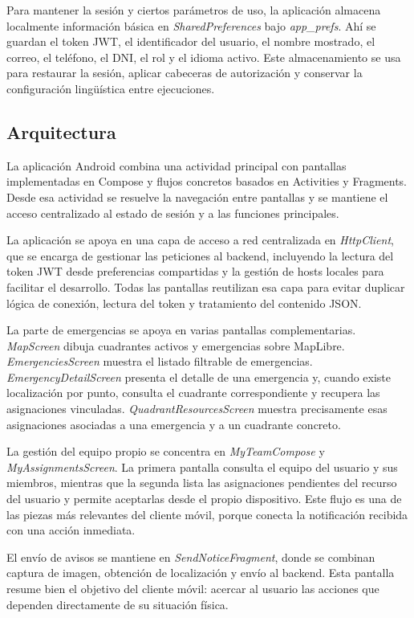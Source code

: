 Para mantener la sesión y ciertos parámetros de uso, la aplicación almacena localmente información básica en \textit{SharedPreferences} bajo \textit{app\_prefs}. Ahí se guardan el token JWT, el identificador del usuario, el nombre mostrado, el correo, el teléfono, el DNI, el rol y el idioma activo. Este almacenamiento se usa para restaurar la sesión, aplicar cabeceras de autorización y conservar la configuración lingüística entre ejecuciones.

\subsection{Arquitectura}

La aplicación Android combina una actividad principal con pantallas implementadas en Compose y flujos concretos basados en Activities y Fragments. Desde esa actividad se resuelve la navegación entre pantallas y se mantiene el acceso centralizado al estado de sesión y a las funciones principales.

La aplicación se apoya en una capa de acceso a red centralizada en \textit{HttpClient}, que se encarga de gestionar las peticiones al backend, incluyendo la lectura del token JWT desde preferencias compartidas y la gestión de hosts locales para facilitar el desarrollo. Todas las pantallas reutilizan esa capa para evitar duplicar lógica de conexión, lectura del token y tratamiento del contenido JSON.


La parte de emergencias se apoya en varias pantallas complementarias. \textit{MapScreen} dibuja cuadrantes activos y emergencias sobre MapLibre. \textit{EmergenciesScreen} muestra el listado filtrable de emergencias. \textit{EmergencyDetailScreen} presenta el detalle de una emergencia y, cuando existe localización por punto, consulta el cuadrante correspondiente y recupera las asignaciones vinculadas. \textit{QuadrantResourcesScreen} muestra precisamente esas asignaciones asociadas a una emergencia y a un cuadrante concreto.

La gestión del equipo propio se concentra en \textit{MyTeamCompose} y \textit{MyAssignmentsScreen}. La primera pantalla consulta el equipo del usuario y sus miembros, mientras que la segunda lista las asignaciones pendientes del recurso del usuario y permite aceptarlas desde el propio dispositivo. Este flujo es una de las piezas más relevantes del cliente móvil, porque conecta la notificación recibida con una acción inmediata.

El envío de avisos se mantiene en \textit{SendNoticeFragment}, donde se combinan captura de imagen, obtención de localización y envío al backend. Esta pantalla resume bien el objetivo del cliente móvil: acercar al usuario las acciones que dependen directamente de su situación física.

